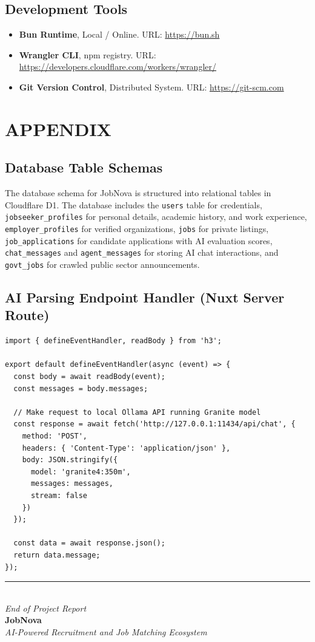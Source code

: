 \documentclass[12pt,a4paper]{report}
\begin{document}
\section{Development Tools}
\begin{itemize}
    \item \textbf{Bun Runtime}, Local / Online. URL: \url{https://bun.sh}
    \item \textbf{Wrangler CLI}, npm registry. URL: \url{https://developers.cloudflare.com/workers/wrangler/}
    \item \textbf{Git Version Control}, Distributed System. URL: \url{https://git-scm.com}
\end{itemize}


\chapter{APPENDIX}

\section{Database Table Schemas}
The database schema for JobNova is structured into relational tables in Cloudflare D1. The database includes the \texttt{users} table for credentials, \texttt{jobseeker\_profiles} for personal details, academic history, and work experience, \texttt{employer\_profiles} for verified organizations, \texttt{jobs} for private listings, \texttt{job\_applications} for candidate applications with AI evaluation scores, \texttt{chat\_messages} and \texttt{agent\_messages} for storing AI chat interactions, and \texttt{govt\_jobs} for crawled public sector announcements.


\section{AI Parsing Endpoint Handler (Nuxt Server Route)}

\begin{lstlisting}[language=HTML, caption=Sample Nuxt Server Route calling Ollama API]
import { defineEventHandler, readBody } from 'h3';

export default defineEventHandler(async (event) => {
  const body = await readBody(event);
  const messages = body.messages;

  // Make request to local Ollama API running Granite model
  const response = await fetch('http://127.0.0.1:11434/api/chat', {
    method: 'POST',
    headers: { 'Content-Type': 'application/json' },
    body: JSON.stringify({
      model: 'granite4:350m',
      messages: messages,
      stream: false
    })
  });
  
  const data = await response.json();
  return data.message;
});
\end{lstlisting}

\vfill

\begin{center}
\rule{0.5\textwidth}{0.5pt}\\
\vspace{0.5cm}
\textit{End of Project Report}\\
\vspace{0.2cm}
\textbf{JobNova}\\
\textit{AI-Powered Recruitment and Job Matching Ecosystem}
\end{center}
\end{document}
